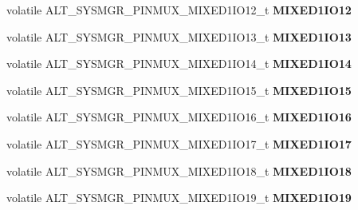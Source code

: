 \begin{DoxyCompactItemize}
volatile A\+L\+T\+\_\+\+S\+Y\+S\+M\+G\+R\+\_\+\+P\+I\+N\+M\+U\+X\+\_\+\+M\+I\+X\+E\+D1\+I\+O12\+\_\+t {\bfseries M\+I\+X\+E\+D1\+I\+O12}
\item 
\mbox{\label{structALT__SYSMGR__PINMUX__s_a16d87599e22d811b56d43305161346a1}} 
volatile A\+L\+T\+\_\+\+S\+Y\+S\+M\+G\+R\+\_\+\+P\+I\+N\+M\+U\+X\+\_\+\+M\+I\+X\+E\+D1\+I\+O13\+\_\+t {\bfseries M\+I\+X\+E\+D1\+I\+O13}
\item 
\mbox{\label{structALT__SYSMGR__PINMUX__s_a01e141690a86f9463db23b517202a14d}} 
volatile A\+L\+T\+\_\+\+S\+Y\+S\+M\+G\+R\+\_\+\+P\+I\+N\+M\+U\+X\+\_\+\+M\+I\+X\+E\+D1\+I\+O14\+\_\+t {\bfseries M\+I\+X\+E\+D1\+I\+O14}
\item 
\mbox{\label{structALT__SYSMGR__PINMUX__s_a41cf4f9e0f03b0744c44ac88ff12a338}} 
volatile A\+L\+T\+\_\+\+S\+Y\+S\+M\+G\+R\+\_\+\+P\+I\+N\+M\+U\+X\+\_\+\+M\+I\+X\+E\+D1\+I\+O15\+\_\+t {\bfseries M\+I\+X\+E\+D1\+I\+O15}
\item 
\mbox{\label{structALT__SYSMGR__PINMUX__s_af3bf3cd2b2550289160c2d6c4e91e461}} 
volatile A\+L\+T\+\_\+\+S\+Y\+S\+M\+G\+R\+\_\+\+P\+I\+N\+M\+U\+X\+\_\+\+M\+I\+X\+E\+D1\+I\+O16\+\_\+t {\bfseries M\+I\+X\+E\+D1\+I\+O16}
\item 
\mbox{\label{structALT__SYSMGR__PINMUX__s_a70b4d8f50868c814a1413c5ce650bcb2}} 
volatile A\+L\+T\+\_\+\+S\+Y\+S\+M\+G\+R\+\_\+\+P\+I\+N\+M\+U\+X\+\_\+\+M\+I\+X\+E\+D1\+I\+O17\+\_\+t {\bfseries M\+I\+X\+E\+D1\+I\+O17}
\item 
\mbox{\label{structALT__SYSMGR__PINMUX__s_a744fc6ad535c0bc5a13dbea749042585}} 
volatile A\+L\+T\+\_\+\+S\+Y\+S\+M\+G\+R\+\_\+\+P\+I\+N\+M\+U\+X\+\_\+\+M\+I\+X\+E\+D1\+I\+O18\+\_\+t {\bfseries M\+I\+X\+E\+D1\+I\+O18}
\item 
\mbox{\label{structALT__SYSMGR__PINMUX__s_a8ddd96da04cda2f9ed9d43e83a951c90}} 
volatile A\+L\+T\+\_\+\+S\+Y\+S\+M\+G\+R\+\_\+\+P\+I\+N\+M\+U\+X\+\_\+\+M\+I\+X\+E\+D1\+I\+O19\+\_\+t {\bfseries M\+I\+X\+E\+D1\+I\+O19}
\item 
\mbox{\label{structALT__SYSMGR__PINMUX__s_aa9bf9c014680409ec582f2035b2c4224}} 

\end{DoxyCompactItemize}
